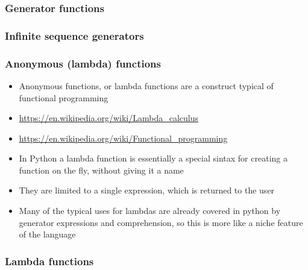 \documentclass[9pt]{beamer}
\begin{document}
\begin{frame}
  \frametitle{Generator functions}
  
\end{frame}


\begin{frame}
  \frametitle{Infinite sequence generators}
  
\end{frame}


\begin{frame}
  \frametitle{Anonymous (lambda) functions}
  \begin{itemize}
    \item \alert{Anonymous functions}, or \alert{lambda functions} are a construct typical of \alert{functional programming}
    \item \url{https://en.wikipedia.org/wiki/Lambda_calculus}
    \item \url{https://en.wikipedia.org/wiki/Functional_programming}
    \item In Python a lambda function is essentially a special sintax for creating a function
          on the fly, without giving it a name
    \item They are limited to \alert{a single expression}, which is returned to the user
    \item Many of the typical uses for lambdas are already covered in python by generator expressions and comprehension,
          so this is more like a niche feature of the language
  \end{itemize}
  
\end{frame}


\begin{frame}
  \frametitle{Lambda functions}
  
\end{frame}
\end{document}
